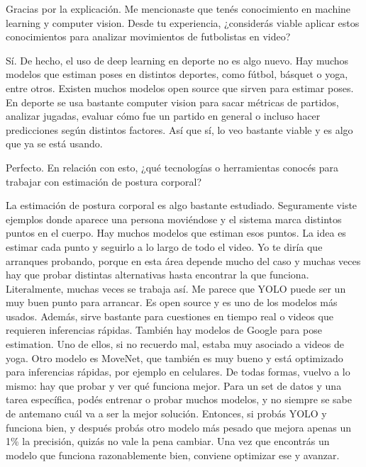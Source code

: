 \begin{description}[leftmargin=0pt, itemindent=\parindent, labelsep=0.5em, itemsep=0pt, parsep=0pt, topsep=0pt]
    \item[\textbf{Entrevistador:}] Gracias por la explicación. Me mencionaste que tenés conocimiento en machine learning y computer vision. Desde tu experiencia, ¿considerás viable aplicar estos conocimientos para analizar movimientos de futbolistas en video?

    \item[\textbf{Gonzalo Pereyra Metnyk:}] Sí. De hecho, el uso de deep learning en deporte no es algo nuevo. Hay muchos modelos que estiman poses en distintos deportes, como fútbol, básquet o yoga, entre otros. Existen muchos modelos open source que sirven para estimar poses. En deporte se usa bastante computer vision para sacar métricas de partidos, analizar jugadas, evaluar cómo fue un partido en general o incluso hacer predicciones según distintos factores. Así que sí, lo veo bastante viable y es algo que ya se está usando.

    \item[\textbf{Entrevistador:}] Perfecto. En relación con esto, ¿qué tecnologías o herramientas conocés para trabajar con estimación de postura corporal?

    \item[\textbf{Gonzalo Pereyra Metnyk:}] La estimación de postura corporal es algo bastante estudiado. Seguramente viste ejemplos donde aparece una persona moviéndose y el sistema marca distintos puntos en el cuerpo. Hay muchos modelos que estiman esos puntos. La idea es estimar cada punto y seguirlo a lo largo de todo el video. Yo te diría que arranques probando, porque en esta área depende mucho del caso y muchas veces hay que probar distintas alternativas hasta encontrar la que funciona. Literalmente, muchas veces se trabaja así. Me parece que YOLO puede ser un muy buen punto para arrancar. Es open source y es uno de los modelos más usados. Además, sirve bastante para cuestiones en tiempo real o videos que requieren inferencias rápidas. También hay modelos de Google para pose estimation. Uno de ellos, si no recuerdo mal, estaba muy asociado a videos de yoga. Otro modelo es MoveNet, que también es muy bueno y está optimizado para inferencias rápidas, por ejemplo en celulares. De todas formas, vuelvo a lo mismo: hay que probar y ver qué funciona mejor. Para un set de datos y una tarea específica, podés entrenar o probar muchos modelos, y no siempre se sabe de antemano cuál va a ser la mejor solución. Entonces, si probás YOLO y funciona bien, y después probás otro modelo más pesado que mejora apenas un 1\% la precisión, quizás no vale la pena cambiar. Una vez que encontrás un modelo que funciona razonablemente bien, conviene optimizar ese y avanzar.


\end{description}

